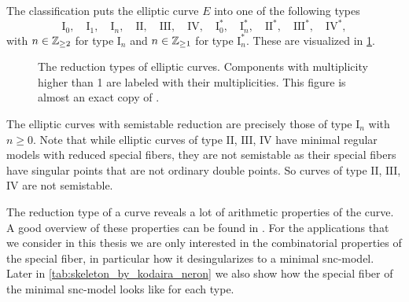 The classification puts the elliptic curve $E$ into one of the following types 
\[
	\mathrm{I}_0,\quad \mathrm{I}_1,\quad \mathrm{I}_n,\quad \mathrm{II},\quad \mathrm{III},\quad \mathrm{IV},\quad \mathrm{I}_0^*,\quad \mathrm{I}_{n}^*,\quad \mathrm{II}^*,\quad \mathrm{III}^*, \quad \mathrm{IV}^*
,\]
with $n \in \mathbb{Z}_{\ge 2}$ for type $\mathrm I_n$ and $n \in \mathbb{Z}_{\ge 1}$ for type $\mathrm I_n^*$. 
These are visualized in \cref{fig:reduction_types_of_e}. 

\begin{figure}[hbtp]
    \centering
    \caption{The reduction types of elliptic curves. Components with multiplicity higher than 1 are labeled with their multiplicities. This figure is almost an exact copy of \cite[fig.\ 4.4]{silvermanAdvancedTopicsArithmetic1994}.}
    \label{fig:reduction_types_of_e}
\end{figure}

The elliptic curves with semistable reduction are precisely those of type $\mathrm I_n$ with $n \ge 0$. 
Note that while elliptic curves of type  $\mathrm{II}$, $\mathrm{III}$, $\mathrm{IV}$ have minimal regular models with reduced special fibers, they are not semistable as their special fibers have singular points that are not ordinary double points. 
So curves of type  $\mathrm{II}$, $\mathrm{III}$, $\mathrm{IV}$ are not semistable. 

The reduction type of a curve reveals a lot of arithmetic properties of the curve. 
A good overview of these properties can be found in \cite[tab.\ 4.1, p.\ 365]{silvermanAdvancedTopicsArithmetic1994}.
For the applications that we consider in this thesis we are only interested in the combinatorial properties of the special fiber, in particular how it desingularizes to a minimal snc-model. 
Later in \cref{tab:skeleton_by_kodaira_neron} we also show how the special fiber of the minimal snc-model looks like for each type. 
